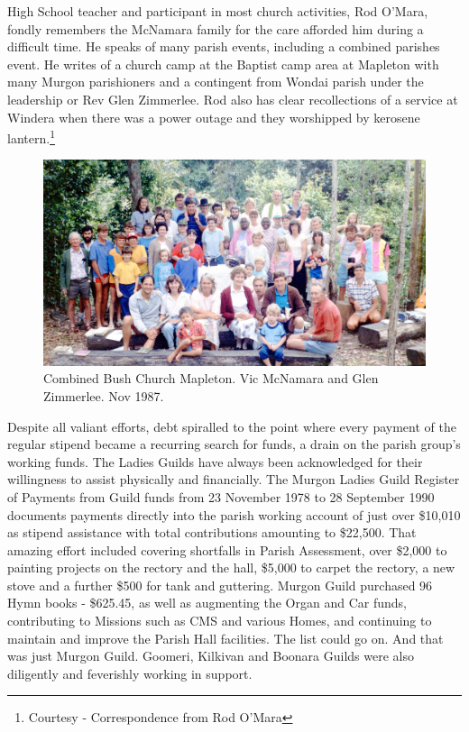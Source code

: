 High School teacher and participant in most church activities, Rod O'Mara, fondly remembers the McNamara family for the care afforded him during a difficult time. He speaks of many parish events, including a combined parishes event. He writes of a church camp at the Baptist camp area at Mapleton with many Murgon parishioners and a contingent from Wondai parish under the leadership or Rev Glen Zimmerlee. Rod also has clear recollections of a service at Windera when there was a power outage and they worshipped by kerosene lantern.\footnote{Courtesy - Correspondence from Rod O'Mara}








\begin{figure}[!htb]
\begin{center}
\includegraphics[width=1.\textwidth,center]{../images/bushChuchMapleton1987.jpg}
\caption{Combined Bush Church Mapleton. Vic McNamara and Glen Zimmerlee. Nov 1987.}
\end{center}
\end{figure}




Despite all valiant efforts, debt spiralled to the point where every payment of the regular stipend became a recurring search for funds, a drain on the parish group's working funds. The Ladies Guilds have always been acknowledged for their willingness to assist physically and financially. The Murgon Ladies Guild Register of Payments from Guild funds from 23 November 1978 to 28 September 1990 documents payments directly into the parish working account of just over \$10,010 as stipend assistance with total contributions amounting to \$22,500. That amazing effort included covering shortfalls in Parish Assessment, over \$2,000 to painting projects on the rectory and the hall, \$5,000 to carpet the rectory, a new stove and a further \$500 for tank and guttering. Murgon Guild purchased 96 Hymn books - \$625.45, as well as augmenting the Organ and Car funds, contributing to Missions such as CMS and various Homes, and continuing to maintain and improve the Parish Hall facilities. The list could go on. And that was just Murgon Guild. Goomeri, Kilkivan and Boonara Guilds were also diligently and feverishly working in support.



